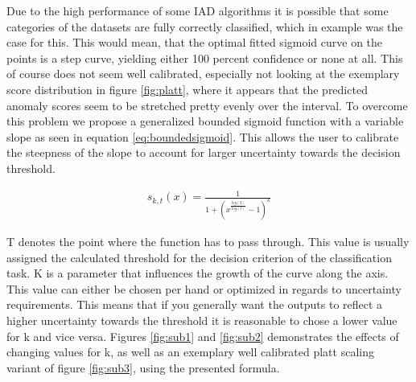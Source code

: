 Due to the high performance of some IAD algorithms it is possible that some categories 
of the datasets are fully correctly classified, which in example was the case for this. This would mean, that the optimal fitted sigmoid curve on the points 
is a step curve, yielding either 100 percent confidence or none at all. This of course does not seem well calibrated, especially not looking at the exemplary score distribution in figure \ref{fig:platt}, where it 
appears that the predicted anomaly scores seem to be stretched pretty evenly over the interval. To overcome this problem 
we propose a generalized bounded sigmoid function with a variable slope \cite{bounded_sigmoid} as seen in equation \ref{eq:boundedsigmoid}. This allows the user to calibrate the steepness of the slope to account for larger uncertainty 
towards the decision threshold.

\begin{equation}
    \label{eq:boundedsigmoid}
    \begin{split}
        s_{k, t}(x) = \frac{1}{1 + (x^{\frac{log(2)}{log(t)}} - 1)^{k}}
    \end{split}
\end{equation}

T denotes the point where the function has to pass through. This value is usually assigned the calculated threshold for the decision criterion of the classification task. K is a parameter 
that influences the growth of the curve along the axis. This value can either be chosen per hand or optimized in regards to uncertainty requirements. This means that if you generally want the 
outputs to reflect a higher uncertainty towards the threshold it is reasonable to chose a lower value for k and vice versa. Figures \ref{fig:sub1} and \ref{fig:sub2} demonstrates the effects of changing values for k, as well 
as an exemplary well calibrated platt scaling variant of figure \ref{fig:sub3}, using the presented formula.

